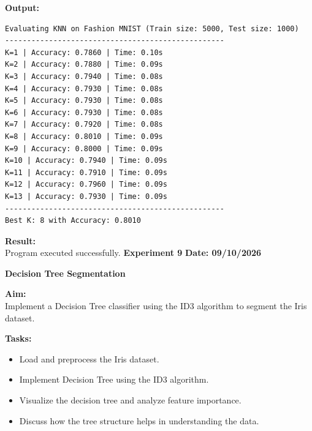\documentclass[12pt, a4paper]{article}
\begin{document}
\vspace{\baselineskip}

\noindent \textbf{Output:}\\
\begin{lstlisting}[style=terminal]
Evaluating KNN on Fashion MNIST (Train size: 5000, Test size: 1000)
--------------------------------------------------
K=1 | Accuracy: 0.7860 | Time: 0.10s
K=2 | Accuracy: 0.7880 | Time: 0.09s
K=3 | Accuracy: 0.7940 | Time: 0.08s
K=4 | Accuracy: 0.7930 | Time: 0.08s
K=5 | Accuracy: 0.7930 | Time: 0.08s
K=6 | Accuracy: 0.7930 | Time: 0.08s
K=7 | Accuracy: 0.7920 | Time: 0.08s
K=8 | Accuracy: 0.8010 | Time: 0.09s
K=9 | Accuracy: 0.8000 | Time: 0.09s
K=10 | Accuracy: 0.7940 | Time: 0.09s
K=11 | Accuracy: 0.7910 | Time: 0.09s
K=12 | Accuracy: 0.7960 | Time: 0.09s
K=13 | Accuracy: 0.7930 | Time: 0.09s
--------------------------------------------------
Best K: 8 with Accuracy: 0.8010
\end{lstlisting}

\vspace{\baselineskip}

\noindent \textbf{Result:}\\
Program executed successfully.
\newpage
\noindent \textbf{Experiment 9} \hfill \textbf{Date: 09/10/2026}\\
\begin{center} \Large \textbf{Decision Tree Segmentation} \end{center}
\textbf{Aim:}\\
Implement a Decision Tree classifier using the ID3 algorithm to segment the Iris dataset.

\vspace{\baselineskip}
\noindent \textbf{Tasks:}\\
\vspace{-0.5\baselineskip}
\begin{itemize}[nosep]
    \item Load and preprocess the Iris dataset.
    \item Implement Decision Tree using the ID3 algorithm.
    \item Visualize the decision tree and analyze feature importance.
    \item Discuss how the tree structure helps in understanding the data.
\end{itemize}
\end{document}
